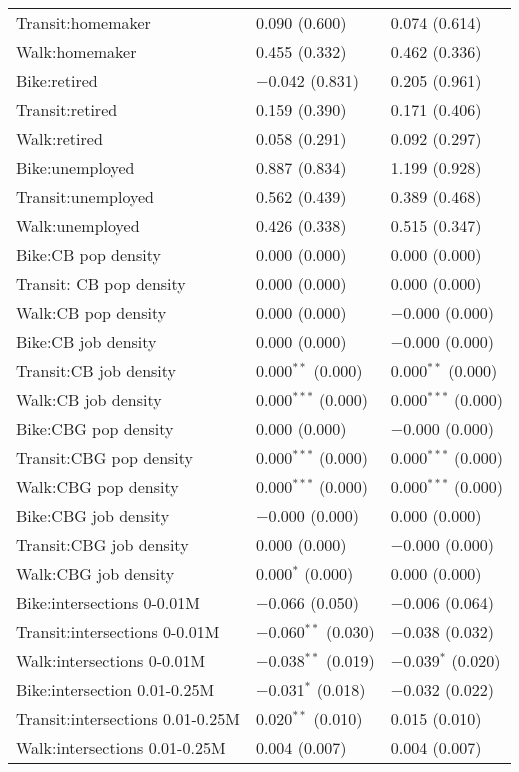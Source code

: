 \begin{longtabu}{lll}
	Transit:homemaker & 0.090 (0.600) & 0.074 (0.614) \\ 
	Walk:homemaker & 0.455 (0.332) & 0.462 (0.336) \\ 
	Bike:retired & $-$0.042 (0.831) & 0.205 (0.961) \\ 
	Transit:retired & 0.159 (0.390) & 0.171 (0.406) \\ 
	Walk:retired & 0.058 (0.291) & 0.092 (0.297) \\ 
	Bike:unemployed & 0.887 (0.834) & 1.199 (0.928) \\ 
	Transit:unemployed & 0.562 (0.439) & 0.389 (0.468) \\ 
	Walk:unemployed & 0.426 (0.338) & 0.515 (0.347) \\ 
	Bike:CB pop density & 0.000 (0.000) & 0.000 (0.000) \\ 
	Transit: CB pop density & 0.000 (0.000) & 0.000 (0.000) \\ 
	Walk:CB pop density & 0.000 (0.000) & $-$0.000 (0.000) \\ 
	Bike:CB job density & 0.000 (0.000) & $-$0.000 (0.000) \\ 
	Transit:CB job density & 0.000$^{**}$ (0.000) & 0.000$^{**}$ (0.000) \\ 
	Walk:CB job density & 0.000$^{***}$ (0.000) & 0.000$^{***}$ (0.000) \\ 
	Bike:CBG pop density & 0.000 (0.000) & $-$0.000 (0.000) \\ 
	Transit:CBG pop density & 0.000$^{***}$ (0.000) & 0.000$^{***}$ (0.000) \\ 
	Walk:CBG pop density & 0.000$^{***}$ (0.000) & 0.000$^{***}$ (0.000) \\ 
	Bike:CBG job density & $-$0.000 (0.000) & 0.000 (0.000) \\ 
	Transit:CBG job density & 0.000 (0.000) & $-$0.000 (0.000) \\ 
	Walk:CBG job density & 0.000$^{*}$ (0.000) & 0.000 (0.000) \\ 
	Bike:intersections 0-0.01M & $-$0.066 (0.050) & $-$0.006 (0.064) \\ 
	Transit:intersections 0-0.01M & $-$0.060$^{**}$ (0.030) & $-$0.038 (0.032) \\ 
	Walk:intersections 0-0.01M & $-$0.038$^{**}$ (0.019) & $-$0.039$^{*}$ (0.020) \\ 
	Bike:intersection 0.01-0.25M & $-$0.031$^{*}$ (0.018) & $-$0.032 (0.022) \\ 
	Transit:intersections 0.01-0.25M & 0.020$^{**}$ (0.010) & 0.015 (0.010) \\ 
	Walk:intersections 0.01-0.25M & 0.004 (0.007) & 0.004 (0.007) \\ 

\end{longtabu}
